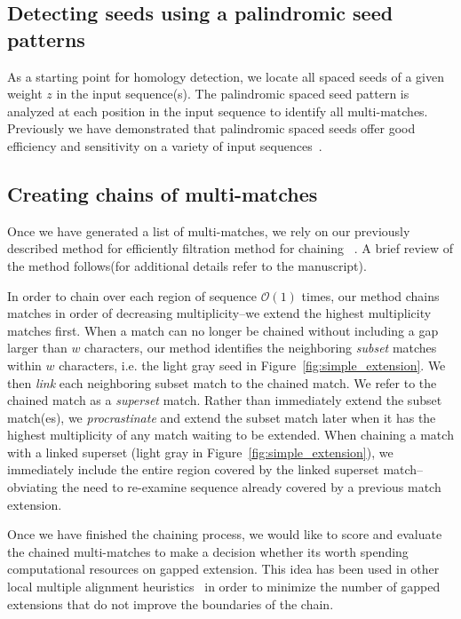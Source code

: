 \documentclass{llncs}
\begin{document}

\subsection{Detecting seeds using a palindromic seed patterns}

As a starting point for homology detection, we locate all spaced seeds of a given weight $z$ in the input sequence(s). The palindromic spaced seed pattern is analyzed at each position in the input sequence to identify all multi-matches.  Previously we have demonstrated that palindromic spaced seeds offer good efficiency and sensitivity on a variety of input sequences~\cite{ref-procrast}. 

\subsection{Creating chains of multi-matches}

Once we have generated a list of multi-matches, we rely on our previously described method for efficiently filtration method for chaining ~\cite{ref-procrast}. A brief review of the method follows(for additional details refer to the manuscript).

In order to chain over each region of sequence $\mathcal{O}(1)$ times,
our method chains matches in order of decreasing multiplicity--we
extend the highest multiplicity matches first. When a match can no
longer be chained without including a gap larger than $w$
characters, our method identifies the neighboring \textit{subset}
matches within $w$ characters, i.e. the light gray seed in
Figure~\ref{fig:simple_extension}. We then \textit{link} each
neighboring subset match to the chained match. We refer to the
chained match as a \textit{superset} match. Rather than immediately
extend the subset match(es), we \textit{procrastinate} and extend
the subset match later when it has the highest multiplicity of any
match waiting to be extended. When chaining a match with a linked
superset (light gray in Figure~\ref{fig:simple_extension}), we
immediately include the entire region covered by the linked superset
match--obviating the need to re-examine sequence already covered by
a previous match extension.

Once we have finished the chaining process, we would like to score and evaluate the chained multi-matches to make a decision whether its worth spending computational resources on gapped extension. This idea has been used in other local multiple alignment heuristics~\cite{...} in order to minimize the number of gapped extensions that do not improve the boundaries of the chain.
\end{document}
